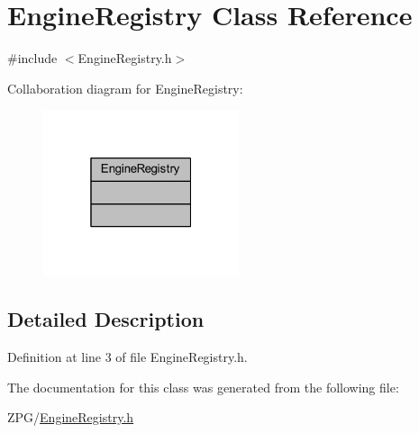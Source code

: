 \hypertarget{classEngineRegistry}{}\section{Engine\+Registry Class Reference}
\label{classEngineRegistry}


{\ttfamily \#include $<$Engine\+Registry.\+h$>$}



Collaboration diagram for Engine\+Registry\+:
\nopagebreak
\begin{figure}[H]
\begin{center}
\leavevmode
\includegraphics[width=163pt]{classEngineRegistry__coll__graph}
\end{center}
\end{figure}


\subsection{Detailed Description}


Definition at line 3 of file Engine\+Registry.\+h.



The documentation for this class was generated from the following file\+:\begin{DoxyCompactItemize}
\item 
Z\+P\+G/\mbox{\hyperlink{EngineRegistry_8h}{Engine\+Registry.\+h}}\end{DoxyCompactItemize}
